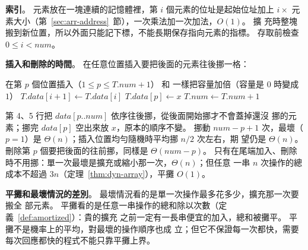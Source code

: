\textbf{索引}。 元素放在一塊連續的記憶體裡，第 $i$ 個元素的位址是起始位址加上
$i \times$ 元素大小（第~\ref{sec:arr-address}~節），一次乘法加一次加法，$O(1)$。 擴
充時整塊搬到新位置，所以外面只能記下標，不能長期保存指向元素的指標。 存取前檢查
$0 \le i < \mathit{num}$。

\textbf{插入和刪除的時間}。 在任意位置插入要把後面的元素往後挪一格：
\begin{pseudo}[unbreakable]{在第 $p$ 個位置插入（$1 \le p \le T.\mathit{num} + 1$）}
        \State 和  一樣把容量加倍（容量是 $0$ 時變成 $1$）
    \EndIf
        \State $T.\mathit{data}[i + 1] \gets T.\mathit{data}[i]$ 
    \EndFor
    \State $T.\mathit{data}[p] \gets x$
    \State $T.\mathit{num} \gets T.\mathit{num} + 1$
\EndProcedure
\end{pseudo}
第 4、5 行把 $\mathit{data}[p..\mathit{num}]$ 依序往後挪，從後面開始挪才不會蓋掉還沒
挪的元素；挪完 $\mathit{data}[p]$ 空出來放 $x$，原本的順序不變。 挪動 $\mathit{num} -
p + 1$ 次，最壞（$p = 1$）是 $\Theta(n)$；插入位置均勻隨機時平均挪 $n/2$ 次左右，期
望仍是 $\Theta(n)$。 刪除第 $p$ 個要把後面的往前挪，同樣是 $\Theta(\mathit{num} -
p)$。 只有在尾端加入、刪除時不用挪：單一次最壞是擴充或縮小那一次，$\Theta(n)$；但任意
一串 $n$ 次操作的總成本不超過 $3n$（定理~\ref{thm:dyn-array}），平攤 $O(1)$。

\textbf{平攤和最壞情況的差別}。 最壞情況看的是單一次操作最多花多少，擴充那一次要搬全
部元素。 平攤看的是任意一串操作的總和除以次數（定義~\ref{def:amortized}）：貴的擴充
之前一定有一長串便宜的加入，總和被攤平。 平攤不是機率上的平均，對最壞的操作順序也成
立；但它不保證每一次都快，需要每次回應都快的程式不能只靠平攤上界。
